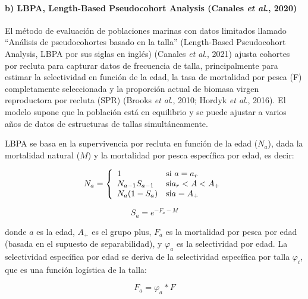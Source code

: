 \documentclass[
  spanish,
]{article}
\begin{document}
\hypertarget{b-lbpa-length-based-pseudocohort-analysis-canales-et-al.-2020}{%
\paragraph{\texorpdfstring{b) LBPA, Length-Based Pseudocohort Analysis
(Canales \emph{et al}.,
2020)}{b) LBPA, Length-Based Pseudocohort Analysis (Canales et al., 2020)}}\label{b-lbpa-length-based-pseudocohort-analysis-canales-et-al.-2020}}

\quad

El método de evaluación de poblaciones marinas con datos limitados
llamado ``Análisis de pseudocohortes basado en la talla'' (Length-Based
Pseudocohort Analysis, LBPA por sus siglas en inglés) (Canales \emph{et
al}., 2021) ajusta cohortes por recluta para capturar datos de
frecuencia de talla, principalmente para estimar la selectividad en
función de la edad, la tasa de mortalidad por pesca (F) completamente
seleccionada y la proporción actual de biomasa virgen reproductora por
recluta (SPR) (Brooks \emph{et al}., 2010; Hordyk \emph{et al}., 2016).
El modelo supone que la población está en equilibrio y se puede ajustar
a varios años de datos de estructuras de tallas simultáneamente.

LBPA se basa en la supervivencia por recluta en función de la edad
(\(N_a\)), dada la mortalidad natural (\(M\)) y la mortalidad por pesca
específica por edad, es decir:

\begin{equation}
N_a = \left\lbrace
\begin{array}{ll}
1 & \textup{si } a=a_r\\
N_{a-1}S_{a-1} & \textup{si} a_r < A < A_+ \\
N_a(1-S_a) & \textup{si} a = A_+
\end{array}
\right.
\end{equation}

\begin{equation}
S_a= e^{-F_a-M}
\end{equation}

donde \(a\) es la edad, \(A_+\) es el grupo plus, \(F_a\) es la
mortalidad por pesca por edad (basada en el supuesto de separabilidad),
y \(\varphi_a\) es la selectividad por edad. La selectividad específica
por edad se deriva de la selectividad específica por talla
\(\varphi_i\), que es una función logística de la talla:

\begin{equation}
F_a=\varphi_a*F
\end{equation}
\end{document}
